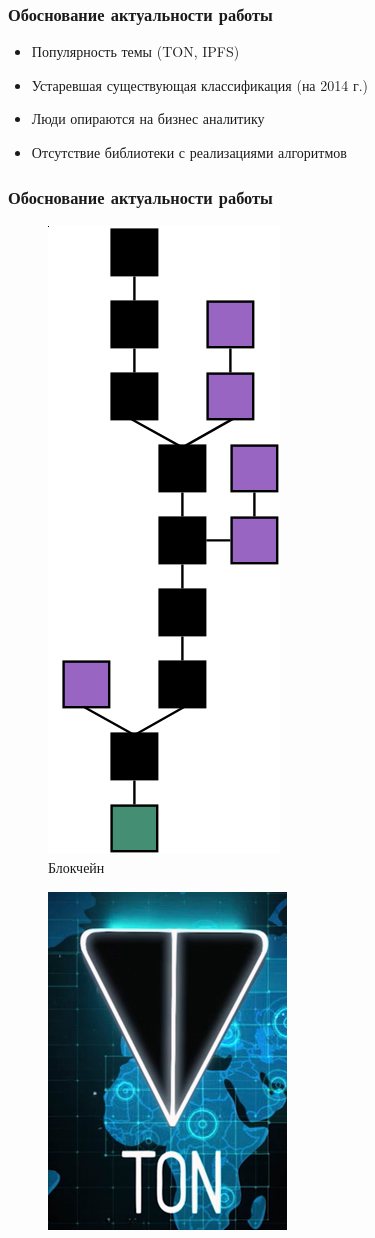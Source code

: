 \documentclass{beamer}
\begin{document}
\begin{frame}[c]
    \frametitle{Обоснование актуальности работы}
    \begin{itemize}
        \item Популярность темы (TON, IPFS)
        \item Устаревшая существующая классификация (на 2014 г.)
        \item Люди опираются на бизнес аналитику
        \item Отсутствие библиотеки с реализациями алгоритмов
    \end{itemize}
\end{frame}

\begin{frame}[c]
    \frametitle{Обоснование актуальности работы}
    \begin{multicols}{2}
    \begin{figure}
        \includegraphics[height=0.8\columnwidth]{blockchain.png}
        \caption{Блокчейн}
    \end{figure}
        \columnbreak
    \begin{figure}
        \includegraphics[height=0.8\columnwidth]{ton.png}

\end{figure}
\end{multicols}
\end{frame}
\end{document}
